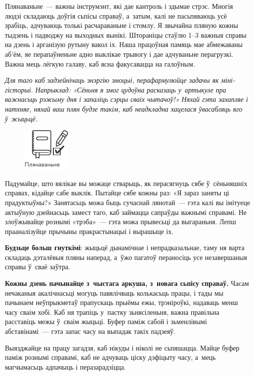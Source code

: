 Плянаваньне~--- важны інструмэнт, які дае кантроль і здымае стрэс. Многія людзі складаюць доўгія сьпісы справаў, а~затым, калі не пасьпяваюць усё зрабіць, адчуваюць толькі расчараваньне і стомлу. Я звычайна пляную кожны тыдзень і падводжу на выходных вынікі. Штораніцы стаўлю 1--3 важныя справы на дзень і арганізую рутыну вакол іх. Наша працоўная памяць мае абмежаваны аб'ём, яе перапаўненьне адно выклікае трывогу і дае адчуваньне перагрузкі. Важна мець лёгкую галаву, каб ясна факусавацца на галоўным.

\emph{Для таго каб задзейнічаць энэргію эмоцыі, перафармулюйце задачы як міні-гісторыі. Напрыклад: «Сёньня я змог цудоўна расказаць у~артыкуле пра важнасьць рэжыму дня і запаліць сэрцы сваіх чытачоў!» Няхай гэта захапляе і натхняе, няхай ваш плян будзе такім, каб неадкладна хацелася ўвасабляць яго ў~жыцьцё.}

\begin{figure}[htb!]
  \centering
  \includegraphics[scale=1.5]{willpower/ch7/24.pdf}
\end{figure}

Падумайце, што вялікае вы можаце стварыць, як перасягнуць сябе ў~сёньняшніх справах, кідайце сабе выклік. Пытайце сябе кожны раз: «Я зараз заняты ці прадуктыўны?» Занятасьць можа быць сучаснай лянотай~--- гэта калі вы імітуеце актыўную дзейнасьць замест таго, каб займацца сапраўды важнымі справамі. Не злоўжывайце рознымі «трэба»~--- гэта можа прывесьці да выгараньня. Лепш прааналізуйце прычыны пракрастынацыі і вырашыце іх.

\textbf{Будзьце больш гнуткімі}: жыцьцё дынамічнае і непрадказальнае, таму ня варта складаць дэталёвыя пляны наперад, а~ўжо пагатоў пераносіць усе незавершаныя справы ў~сваё заўтра.

\textbf{Кожны дзень пачынайце з~чыстага аркуша, з~новага сьпісу справаў.} Часам нечаканыя акалічнасьці могуць павялічваць колькасьць працы, і тады мы пачынаем неўпрыкметаў прапускаць прыёмы ежы, трэніроўкі, надаваць менш часу сваім хобі. Каб ня трапіць у~пастку зьнясіленьня, важна правільна расставіць межы ў~сваім жыцьці. Буфер паміж сабой і зьменлівымі абставінамі~--- гэта запас часу на выпадак такіх падзеяў. 

Выязджайце на працу загадзя, каб нікуды і ніколі не сьпяшацца. Майце буфер паміж рознымі справамі, каб не адчуваць ціску дэфіцыту часу, а~мець магчымасьць адпачыць і перазарадзіцца.


